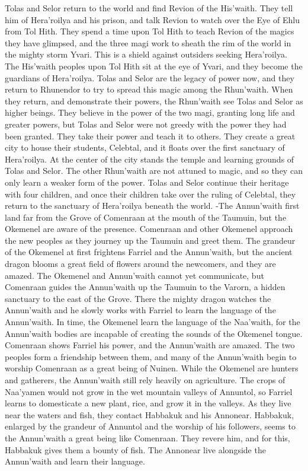 \documentclass[smalldemyvopaper,11pt,twoside,onecolumn,openright,extrafontsizes]{memoir}
\begin{document}
{{Tolas and Selor return to the world and find Revion of the His’waith. They tell him of Hera’roilya and his prison, and talk Revion to watch over the Eye of Ehlu from Tol Hith. They spend a time upon Tol Hith to teach Revion of the magics they have glimpsed, and the three magi work to sheath the rim of the world in the mighty storm Yvari. This is a shield against outsiders seeking Hera’roilya. The His’waith peoples upon Tol Hith sit at the eye of Yvari, and they become the guardians of Hera’roilya. Tolas and Selor are the legacy of power now, and they return to Rhunendor to try to spread this magic among the Rhun’waith. When they return, and demonstrate their powers, the Rhun’waith see Tolas and Selor as higher beings. They believe in the power of the two magi, granting long life and greater powers, but Tolas and Selor were not greedy with the power they had been granted. They take their power and teach it to others. They create a great city to house their students, Celebtal, and it floats over the first sanctuary of Hera’roilya. At the center of the city stands the temple and learning grounds of Tolas and Selor. The other Rhun’waith are not attuned to magic, and so they can only learn a weaker form of the power. Tolas and Selor continue their heritage with four children, and once their children take over the ruling of Celebtal, they return to the sanctuary of Hera’roilya beneath the world.
-The Annun’waith first land far from the Grove of Comenraan at the mouth of the Taumuin, but the Okemenel are aware of the presence. Comenraan and other Okemenel approach the new peoples as they journey up the Taumuin and greet them. The grandeur of the Okemenel at first frightens Farriel and the Annun’waith, but the ancient dragon blooms a great field of flowers around the newcomers, and they are amazed. The Okemenel and Annun’waith cannot yet communicate, but Comenraan guides the Annun’waith up the Taumuin to the Varorn, a hidden sanctuary to the east of the Grove. There the mighty dragon watches the Annun’waith and he slowly works with Farriel to learn the language of the Annun’waith. In time, the Okemenel learn the language of the Naa’waith, for the Annun’waith bodies are incapable of creating the sounds of the Okemenel tongue. Comenraan shows Farriel his power, and the Annun’waith are amazed. The two peoples form a friendship between them, and many of the Annun’waith begin to worship Comenraan as a great being of Nuinen. While the Okemenel are hunters and gatherers, the Annun’waith still rely heavily on agriculture. The crops of Naa’yamen would not grow in the wet mountain valleys of Annuntol, so Farriel learns to domesticate a new plant, rice, and grow it in the valleys. As they live near the waters and fish, they contact Habbakuk and his Annonear. Habbakuk, enlarged by the grandeur of Annuntol and the worship of his followers, seems to the Annun’waith a great being like Comenraan. They revere him, and for this, Habbakuk gives them a bounty of fish. The Annonear live alongside the Annun’waith and learn their language.

}}
\end{document}
